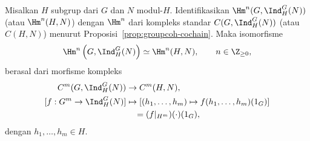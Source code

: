 \begin{proposition}\label{prop:Shapiro-std-coh}
	Misalkan $H$ subgrup dari $G$ dan $N$ modul-$H$. Identifikasikan
	$\Hm^n(G,\Ind^G_H(N))$ (atau $\Hm^n(H,N)$) dengan $\Hm^n$ dari kompleks
	standar $C(G,\Ind^G_H(N))$ (atau $C(H,N)$) menurut
	Proposisi~\ref{prop:groupcoh-cochain}. Maka isomorfisme
	\[ \Hm^n\left(G,\Ind^G_H(N)\right)\simeq\Hm^n(H,N),
	\qquad n\in\Z_{\geq0}, \]
	berasal dari morfisme kompleks
	\begin{align*}
		C^m(G,\Ind^G_H(N))&\to C^m(H,N),\\
		[f:G^m\to\Ind^G_H(N)]&\mapsto
		[(h_1,\ldots,h_m)\mapsto f(h_1,\ldots,h_m)(1_G)]\\
		&\quad=(f|_{H^m})(\cdot)(1_G),
	\end{align*}
	dengan $h_1,\ldots,h_m\in H$.
\end{proposition}
